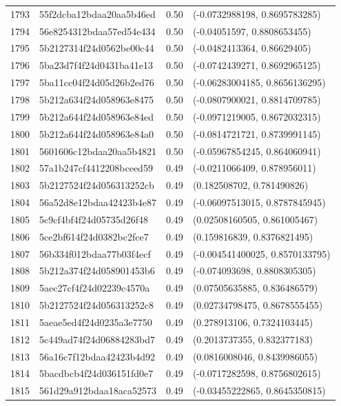 \begin{table}[ht]
\begin{tabular}{rlrl}
  1793 & 55f2dcba12bdaa20aa5b46ed & 0.50 & (-0.0732988198, 0.8695783285) \\ 
  1794 & 56e8254312bdaa57ed54e434 & 0.50 & (-0.04051597, 0.8808653455) \\ 
  1795 & 5b2127314f24d0562be00c44 & 0.50 & (-0.0482413364, 0.86629405) \\ 
  1796 & 5ba23d7f4f24d0431ba41e13 & 0.50 & (-0.0742439271, 0.8692965125) \\ 
  1797 & 5ba11cc04f24d05d26b2ed76 & 0.50 & (-0.06283004185, 0.8656136295) \\ 
  1798 & 5b212a634f24d058963e8475 & 0.50 & (-0.0807900021, 0.8814709785) \\ 
  1799 & 5b212a644f24d058963e84ed & 0.50 & (-0.0971219005, 0.8672032315) \\ 
  1800 & 5b212a644f24d058963e84a0 & 0.50 & (-0.0814721721, 0.8739991145) \\ 
  1801 & 5601606c12bdaa20aa5b4821 & 0.50 & (-0.05967854245, 0.864060941) \\ 
  1802 & 57a1b247cf4412208bceed59 & 0.49 & (-0.0211066409, 0.878956011) \\ 
  1803 & 5b2127524f24d056313252cb & 0.49 & (0.182508702, 0.781490826) \\ 
  1804 & 56a52d8e12bdaa42423b4e87 & 0.49 & (-0.06097513015, 0.8787845945) \\ 
  1805 & 5c9cf4bf4f24d05735d26f48 & 0.49 & (0.02508160505, 0.861005467) \\ 
  1806 & 5ce2bf614f24d0382bc2fce7 & 0.49 & (0.159816839, 0.8376821495) \\ 
  1807 & 56b334f012bdaa77b03f4ecf & 0.49 & (-0.004541400025, 0.8570133795) \\ 
  1808 & 5b212a374f24d058901453b6 & 0.49 & (-0.074093698, 0.8808305305) \\ 
  1809 & 5aec27cf4f24d02239c4570a & 0.49 & (0.07505635885, 0.836486579) \\ 
  1810 & 5b2127524f24d056313252c8 & 0.49 & (0.02734798475, 0.8678555455) \\ 
  1811 & 5aeae5ed4f24d0235a3e7750 & 0.49 & (0.278913106, 0.7324103445) \\ 
  1812 & 5c449ad74f24d06884283bd7 & 0.49 & (0.2013737355, 0.832377183) \\ 
  1813 & 56a16c7f12bdaa42423b4d92 & 0.49 & (0.0816008046, 0.8439986055) \\ 
  1814 & 5bacdbcb4f24d036151fd0e7 & 0.49 & (-0.0717282598, 0.8756802615) \\ 
  1815 & 561d29a912bdaa18aca52573 & 0.49 & (-0.03455222865, 0.8645350815) \\ 

\end{tabular}
\end{table}

